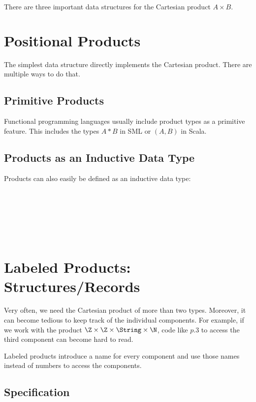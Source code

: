 There are three important data structures for the Cartesian product $A\times B$.

\section{Positional Products}

The simplest data structure directly implements the Cartesian product.
There are multiple ways to do that.

\subsection{Primitive Products}

Functional programming languages usually include product types as a primitive feature.
This includes the types $A*B$ in SML or $(A,B)$ in Scala.

\subsection{Products as an Inductive Data Type}

Products can also easily be defined as an inductive data type:
\begin{acode}
\\
\\
\\
\\
\\
\end{acode}

\section{Labeled Products: Structures/Records}

Very often, we need the Cartesian product of more than two types.
Moreover, it can become tedious to keep track of the individual components.
For example, if we work with the product $\Z\times \Z\times \String\times \N$, code like $p.3$ to access the third component can become hard to read.

Labeled products introduce a name for every component and use those names instead of numbers to access the components.

\subsection{Specification}

